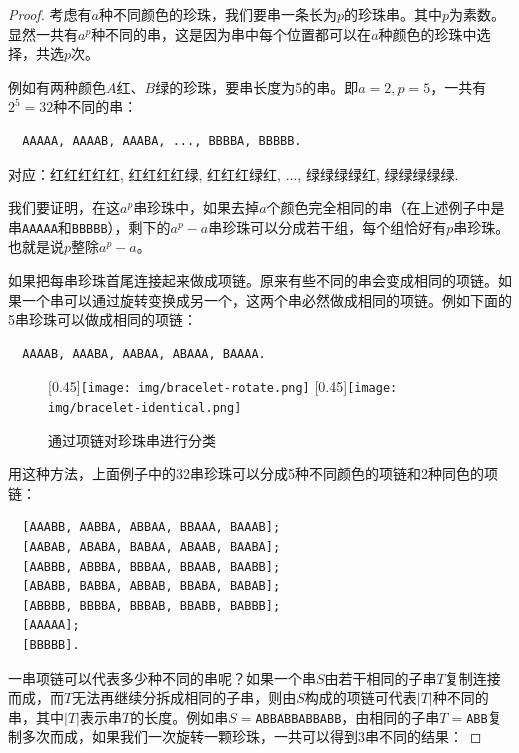 \documentclass[b5paper]{ctexart}
\begin{document}
\begin{proof}
考虑有$a$种不同颜色的珍珠，我们要串一条长为$p$的珍珠串。其中$p$为素数。显然一共有$a^p$种不同的串，这是因为串中每个位置都可以在$a$种颜色的珍珠中选择，共选$p$次。

例如有两种颜色$A$红、$B$绿的珍珠，要串长度为5的串。即$a = 2, p = 5$，一共有$2^5 = 32$种不同的串：

\begin{verbatim}
  AAAAA, AAAAB, AAABA, ..., BBBBA, BBBBB.
\end{verbatim}

对应：红红红红红, 红红红红绿, 红红红绿红, ..., 绿绿绿绿红, 绿绿绿绿绿.

我们要证明，在这$a^p$串珍珠中，如果去掉$a$个颜色完全相同的串（在上述例子中是串\texttt{AAAAA}和\texttt{BBBBB}），剩下的$a^p - a$串珍珠可以分成若干组，每个组恰好有$p$串珍珠。也就是说$p$整除$a^p - a$。

如果把每串珍珠首尾连接起来做成项链。原来有些不同的串会变成相同的项链。如果一个串可以通过旋转变换成另一个，这两个串必然做成相同的项链。例如下面的5串珍珠可以做成相同的项链：

\begin{verbatim}
  AAAAB, AAABA, AABAA, ABAAA, BAAAA.
\end{verbatim}

\begin{figure}[htbp]
  \centering
  [0.45\linewidth]{\texttt{[image: img/bracelet-rotate.png]}} \quad
  [0.45\linewidth]{\texttt{[image: img/bracelet-identical.png]}}
  \caption{通过项链对珍珠串进行分类}
  \label{fig:bracelet}
\end{figure}

用这种方法，上面例子中的32串珍珠可以分成5种不同颜色的项链和2种同色的项链：

\begin{verbatim}
  [AAABB, AABBA, ABBAA, BBAAA, BAAAB];
  [AABAB, ABABA, BABAA, ABAAB, BAABA];
  [AABBB, ABBBA, BBBAA, BBAAB, BAABB];
  [ABABB, BABBA, ABBAB, BBABA, BABAB];
  [ABBBB, BBBBA, BBBAB, BBABB, BABBB];
  [AAAAA];
  [BBBBB].
\end{verbatim}

一串项链可以代表多少种不同的串呢？如果一个串$S$由若干相同的子串$T$复制连接而成，而$T$无法再继续分拆成相同的子串，则由$S$构成的项链可代表$|T|$种不同的串，其中$|T|$表示串$T$的长度。例如串$S=$\texttt{ABBABBABBABB}，由相同的子串$T=$\texttt{ABB}复制多次而成，如果我们一次旋转一颗珍珠，一共可以得到3串不同的结果：


\end{proof}
\end{document}
